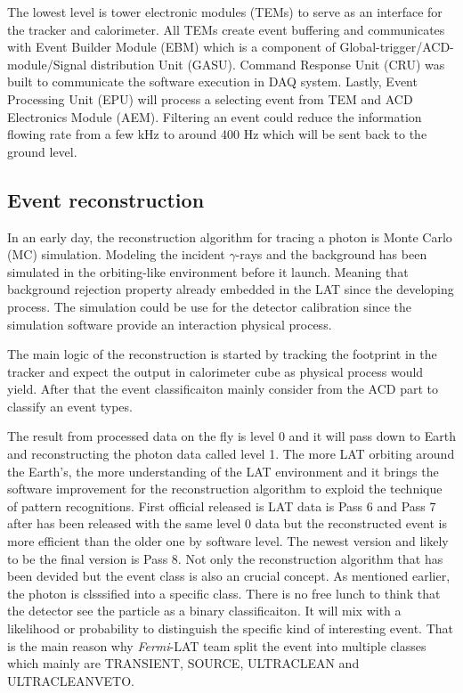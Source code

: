 The lowest level is tower electronic modules (TEMs) to serve as an 
interface for the tracker and calorimeter. All TEMs create event 
buffering and communicates with Event Builder Module (EBM) which is a
component of Global-trigger/ACD-module/Signal distribution Unit (GASU).
Command Response Unit (CRU) was built to communicate the
software execution in DAQ system. Lastly, Event Processing Unit (EPU)
will process a selecting event from TEM and ACD Electronics Module (AEM).
Filtering an event could reduce the information flowing rate from 
a few kHz to around 400 Hz which will be sent back to the ground level.


\subsection{Event reconstruction}

In an early day, the reconstruction algorithm for tracing a photon 
is Monte Carlo (MC) simulation. Modeling the incident $\gamma$-rays 
and the background has been simulated in the orbiting-like environment 
before it launch. Meaning that background rejection property already 
embedded in the LAT since the developing process. The simulation 
could be use for the detector calibration since the simulation software 
provide an interaction physical process.

The main logic of the reconstruction is started by tracking the footprint 
in the tracker and expect the output in calorimeter cube as physical process 
would yield. After that the event classificaiton mainly consider from 
the ACD part to classify an event types.

The result from processed data on the fly is level 0 and it will pass 
down to Earth and reconstructing the photon data called level 1.
The more LAT orbiting around the Earth's, the more understanding of the 
LAT environment and it brings the software improvement for the reconstruction
algorithm to exploid the technique of pattern recognitions.
First official released is LAT data is Pass 6 and Pass 7 after has been 
released with the same level 0 data but the reconstructed event is 
more efficient than the older one by software level. The newest version 
and likely to be the final version is Pass 8. Not only the reconstruction
algorithm that has been devided but the event class is also an 
crucial concept. As mentioned earlier, the photon is clsssified into 
a specific class. There is no free lunch to think that the detector see 
the particle as a binary classificaiton. It will mix with a likelihood 
or probability to distinguish the specific kind of interesting event.
That is the main reason why \textit{Fermi}-LAT team split the event 
into multiple classes which mainly are TRANSIENT, SOURCE, ULTRACLEAN and 
ULTRACLEANVETO.

